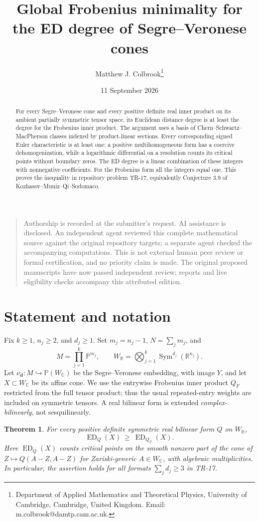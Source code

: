 \documentclass[11pt]{article}
\title{Global Frobenius minimality for the ED degree of Segre--Veronese cones}
\author{Matthew J. Colbrook\thanks{Department of Applied Mathematics and Theoretical Physics, University of Cambridge, Cambridge, United Kingdom. Email: m.colbrook@damtp.cam.ac.uk.}}
\date{11 September 2026}
\newtheorem{theorem}{Theorem}
\theoremstyle{remark}\newtheorem{remark}[theorem]{Remark}
\newcommand{\C}{\mathbb C}
\newcommand{\R}{\mathbb R}
\newcommand{\PP}{\mathbb P}
\newcommand{\ED}{\operatorname{ED}}
\begin{document}
\maketitle


\begin{quote}\small
Authorship is recorded at the submitter's request. AI assistance is disclosed. An independent agent reviewed this complete mathematical source against the original repository targets; a separate agent checked the accompanying computations. This is not external human peer review or formal certification, and no priority claim is made. The original proposed manuscripts have now passed independent review; reports and live eligibility checks accompany this attributed edition.
\end{quote}
\begin{abstract}
For every Segre--Veronese cone and every positive definite real inner product on its ambient partially symmetric tensor space, its Euclidean distance degree is at least the degree for the Frobenius inner product. The argument uses a basis of Chern--Schwartz--MacPherson classes indexed by product-linear sections. Every corresponding signed Euler characteristic is at least one: a positive multihomogeneous form has a coercive dehomogenization, while a logarithmic differential on a resolution counts its critical points without boundary zeros. The ED degree is a linear combination of these integers with nonnegative coefficients. For the Frobenius form all the integers equal one. This proves the inequality in repository problem TR-17, equivalently Conjecture 3.9 of Kozhasov--Muniz--Qi--Sodomaco.
\end{abstract}

\section{Statement and notation}
Fix $k\geq1$, $n_j\geq2$, and $d_j\geq1$. Set $m_j=n_j-1$, $N=\sum_jm_j$, and
\[
 M=\prod_{j=1}^k\PP^{m_j},\qquad
 W_{\R}=\bigotimes_{j=1}^k\operatorname{Sym}^{d_j}(\R^{n_j}).
\]
Let $\nu_{\mathbf d}:M\hookrightarrow\PP(W_{\C})$ be the Segre--Veronese embedding, with image $Y$, and let $X\subset W_{\C}$ be its affine cone. We use the entrywise Frobenius inner product $Q_F$ restricted from the full tensor product; thus the usual repeated-entry weights are included on symmetric tensors. A real bilinear form is extended \emph{complex-bilinearly}, not sesquilinearly.

\begin{theorem}\label{thm:main}
For every positive definite symmetric real bilinear form $Q$ on $W_{\R}$,
\[
 \boxed{\ED_Q(X)\ \geq\ \ED_{Q_F}(X).}
\]
Here $\ED_Q(X)$ counts critical points on the smooth nonzero part of the cone of $Z\mapsto Q(A-Z,A-Z)$ for Zariski-generic $A\in W_{\C}$, with algebraic multiplicities. In particular, the assertion holds for all formats $\sum_jd_j\geq3$ in TR-17.
\end{theorem}
\end{document}
